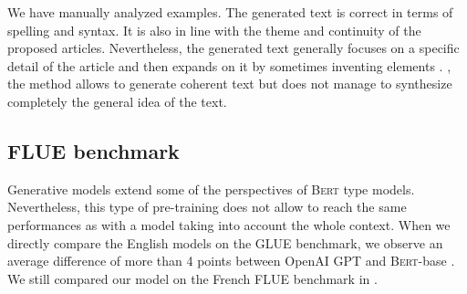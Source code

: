We have manually analyzed examples. The generated text is correct in terms of spelling and syntax. It is also in line with the theme and continuity of the proposed articles. Nevertheless, the generated text generally focuses on a specific detail of the article and then expands on it by sometimes inventing elements \parencite{kryscinski_19}. , the method allows to generate coherent text but does not manage to synthesize completely the general idea of the text.

\subsection{FLUE benchmark} 

Generative models extend some of the perspectives of \textsc{Bert} type models. Nevertheless, this type of pre-training does not allow to reach the same performances as with a model taking into account the whole context. When we directly compare the English models on the GLUE benchmark, we observe an average difference of more than 4 points between OpenAI GPT and \textsc{Bert}-base \parencite{radford_2018}. We still compared our model on the French FLUE benchmark in .

